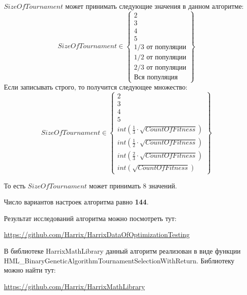$SizeOfTournament$ может принимать следующие значения в данном алгоритме:
\begin{equation}
SizeOfTournament \in \begin{Bmatrix}
2\\ 
3\\ 
4\\ 
5\\ 
1/3\text{ от популяции}\\ 
1/2\text{ от популяции}\\ 
2/3\text{ от популяции}\\ 
\text{Вся популяция} 
\end{Bmatrix}
\end{equation}
Если записывать строго, то получится следующее множество:
\begin{equation}
SizeOfTournament \in \begin{Bmatrix}
2\\ 
3\\ 
4\\ 
5\\ 
int\left( \frac{1}{3}\cdot \sqrt{CountOfFitness}\right)  \\ 
int\left( \frac{1}{2}\cdot \sqrt{CountOfFitness}\right)\\ 
int\left( \frac{2}{3}\cdot \sqrt{CountOfFitness}\right)\\ 
int\left( \sqrt{CountOfFitness}\right)
\end{Bmatrix}
\end{equation}

То есть $SizeOfTournament$ может принимать $ 8 $ значений.

Число вариантов настроек алгоритма равно \textbf{144}.

Результат исследований алгоритма можно посмотреть тут:

\href{https://github.com/Harrix/HarrixDataOfOptimizationTesting}{https://github.com/Harrix/HarrixDataOfOptimizationTesting}

В библиотеке HarrixMathLibrary данный алгоритм реализован в виде функции HML\_BinaryGeneticAlgorithmTournamentSelectionWithReturn. Библиотеку можно найти тут:

\href{https://github.com/Harrix/HarrixMathLibrary}{https://github.com/Harrix/HarrixMathLibrary}